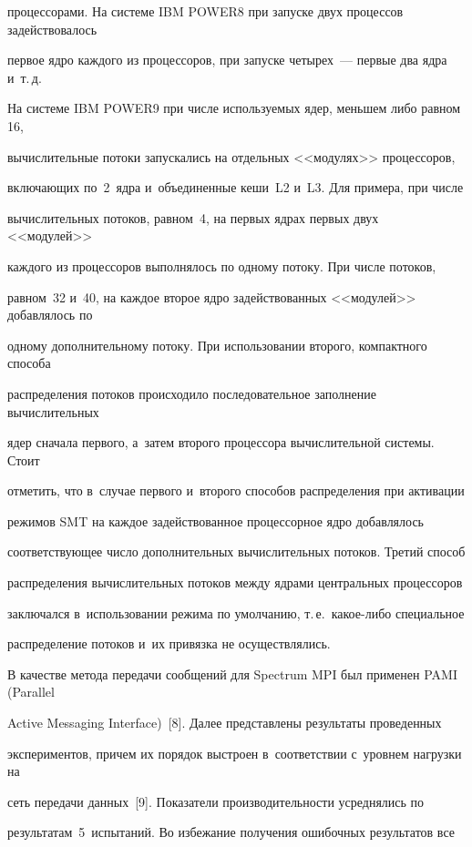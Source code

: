 процессорами. На системе IBM POWER8 при запуске двух процессов задействовалось 


первое ядро каждого из процессоров, при запуске четырех~--- первые два ядра и~т.\,д. 


На системе IBM POWER9 при числе используемых ядер, меньшем либо равном 16, 


вычислительные потоки запускались на отдельных <<модулях>> процессоров, 


включающих по~2~ядра и~объединенные кеши~L2 и~L3. Для примера, при числе 


вычислительных потоков, равном~4, на первых ядрах первых двух <<модулей>> 


каждого из процессоров выполнялось по одному потоку. При чис\-ле потоков, 


равном~32 и~40, на каждое второе ядро задействованных <<модулей>> добавлялось по 


одному дополнительному потоку. При использовании второго, компактного способа 


распределения потоков происходило последовательное заполнение вычислительных 


ядер сначала первого, а~затем второго процессора вычислительной системы. Стоит 


отметить, что в~случае первого и~второго способов распределения при активации 


режимов SMT на каждое задействованное процессорное ядро добавлялось 


соответствующее чис\-ло дополнительных вы\-чис\-ли\-тель\-ных потоков. Третий способ 


распределения вычислительных потоков между ядрами центральных процессоров 


заключался в~использовании режима по умолчанию, т.\,е.\ ка\-кое-ли\-бо специальное 


распределение потоков и~их привязка не осуществлялись.





В качестве метода передачи сообщений для Spectrum MPI был применен PAMI (Parallel 


Active Messaging Interface)~[8]. Далее представлены результаты проведенных 


экспериментов, причем их порядок выстроен в~соответствии с~уровнем нагрузки на 


сеть передачи данных~[9]. Показатели производительности усреднялись по 


результатам~5~испытаний. Во избежание получения ошибочных результатов все 


